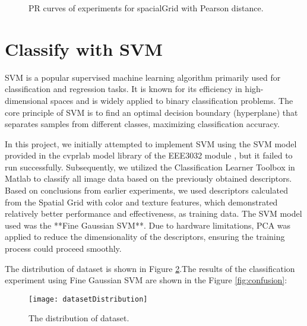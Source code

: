 \documentclass{article}
\begin{document}
\begin{figure}[!tbp]
  \centering
  \hfill
  \hfill
  \caption{\label{fig:pearson} PR curves of experiments for spacialGrid with Pearson distance.}
\end{figure}



\section{Classify with SVM}

SVM is a popular supervised machine learning algorithm primarily used for classification and regression tasks. It is known for its efficiency in high-dimensional spaces and is widely applied to binary classification problems. The core principle of SVM is to find an optimal decision boundary (hyperplane) that separates samples from different classes, maximizing classification accuracy.

In this project, we initially attempted to implement SVM using the SVM model provided in the cvprlab model library of the EEE3032 module \citep{EEE3032}, but it failed to run successfully. Subsequently, we utilized the Classification Learner Toolbox\citep{MATLAB} in Matlab to classify all image data based on the previously obtained descriptors. Based on conclusions from earlier experiments, we used descriptors calculated from the Spatial Grid with color and texture features, which demonstrated relatively better performance and effectiveness, as training data. The SVM model used was the **Fine Gaussian SVM**. Due to hardware limitations, PCA was applied to reduce the dimensionality of the descriptors, ensuring the training process could proceed smoothly.

The distribution of dataset is shown in Figure \ref{fig:distribution}.The results of the classification experiment using Fine Gaussian SVM are shown in the Figure \ref{fig:confusion}:


\begin{figure}[h]
  \begin{center}
  \texttt{[image: datasetDistribution]}
  \end{center}
  \caption{\label{fig:distribution} The distribution of dataset.}
  \end{figure}
\end{document}
